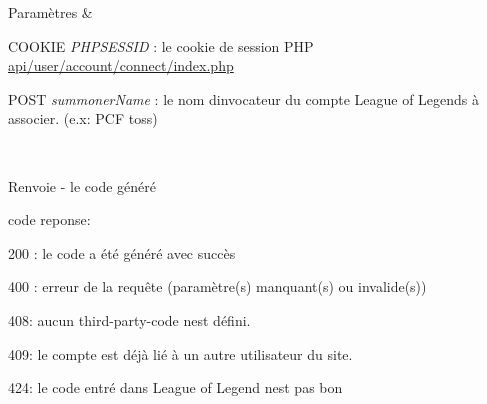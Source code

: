 \begin{DoxyParams}{Paramètres}
{\em } & 
\begin{DoxyItemize}
\item C\+O\+O\+K\+IE {\itshape P\+H\+P\+S\+E\+S\+S\+ID} \+: le cookie de session P\+HP \hyperlink{user_2account_2connect_2index_8php}{api/user/account/connect/index.\+php}
\item P\+O\+ST {\itshape summoner\+Name} \+: le nom d\textquotesingle{}invocateur du compte League of Legends à associer. (e.\+x\+: \textquotesingle{}P\+CF toss\textquotesingle{}) 
\end{DoxyItemize}\\
\hline
\end{DoxyParams}
\begin{DoxyReturn}{Renvoie}
-\/ le code généré
\begin{DoxyItemize}
\item code reponse\+:
\item 200 \+: le code a été généré avec succès
\item 400 \+: erreur de la requête (paramètre(s) manquant(s) ou invalide(s))
\item 408\+: aucun third-\/party-\/code n\textquotesingle{}est défini.
\item 409\+: le compte est déjà lié à un autre utilisateur du site.
\item 424\+: le code entré dans League of Legend n\textquotesingle{}est pas bon 
\end{DoxyItemize}
\end{DoxyReturn}
